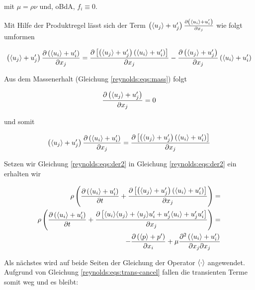 mit $\mu = \rho \nu$ und, oBdA, $f_i \equiv 0$.

Mit Hilfe der Produktregel lässt sich der Term $\left( \langle u_j \rangle + u_j' \right) \frac{\partial \left( \langle u_i \rangle + u_i' \right)}{\partial x_j}$
wie folgt umformen

\begin{equation}
    \left( \langle u_j \rangle + u_j' \right) \frac{\partial \left( \langle u_i \rangle + u_i' \right)}{\partial x_j} =
        \frac{\partial \left[ \left( \langle u_j \rangle + u_j' \right) \left( \langle u_i \rangle + u_i' \right) \right]}{\partial x_j}
        - \frac{\partial \left( \langle u_j \rangle + u_j' \right)}{\partial x_j} \left( \langle u_i \rangle + u_i' \right)
\end{equation}

Aus dem Massenerhalt (Gleichung \ref{reynolds:eqs:mass}) folgt

\begin{equation}
    \frac{\partial \left( \langle u_j \rangle + u_j' \right)}{\partial x_j} = 0
\end{equation}

und somit

\begin{equation}
    \label{reynolds:eqs:der2}
    \left( \langle u_j \rangle + u_j' \right) \frac{\partial \left( \langle u_i \rangle + u_i' \right)}{\partial x_j} =
        \frac{\partial \left[ \left( \langle u_j \rangle + u_j' \right) \left( \langle u_i \rangle + u_i' \right) \right]}{\partial x_j}
\end{equation}

Setzen wir Gleichung \ref{reynolds:eqs:der2} in Gleichung \ref{reynolds:eqs:der2} ein erhalten wir

\begin{align}
    \rho \left(
            \frac{\partial \left( \langle u_i \rangle + u_i' \right)}{\partial t} +
            \frac{\partial \left[ \left( \langle u_j \rangle + u_j' \right) \left( \langle u_i \rangle + u_i' \right) \right]}{\partial x_j}
        \right) = \\
    \rho \left(
            \frac{\partial \left( \langle u_i \rangle + u_i' \right)}{\partial t} +
            \frac{\partial \left[ \langle u_i \rangle \langle u_j \rangle  + \langle u_j \rangle u_i' + u_j' \langle u_i \rangle + u_j' u_i'\right]}{\partial x_j}
        \right) = \\
    - \frac{\partial \left( \langle p \rangle + p' \right)}{\partial x_i} + 
    \mu \frac{\partial^2 \left( \langle u_i \rangle + u_i' \right)}{\partial x_j \partial x_j}
\end{align}

Als nächstes wird auf beide Seiten der Gleichung der Operator $\langle \cdot \rangle$ angewendet.
Aufgrund von Gleichung \ref{reynolds:eqs:trans-cancel} fallen die transienten Terme somit
weg und es bleibt:

